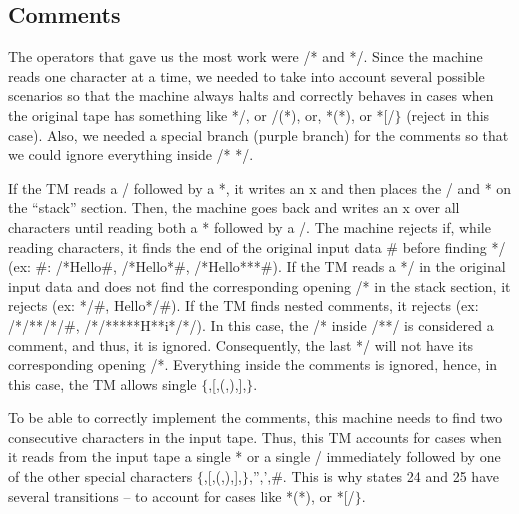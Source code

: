 \documentclass{article}
\begin{document}
\subsection{Comments}

The operators that gave us the most work were /* and */. Since the machine reads one character at a time, we needed to take into account several possible scenarios 
so that the machine always halts and correctly behaves in cases when the original tape has something like *{/}, or /(*), or, *(*), or *[/$\}$ (reject in this case). 
Also, we needed a special branch (purple branch) for the comments so that we could 
ignore everything inside /* */.

If the TM reads a / followed by a *, it writes an x and then places the / and * on the “stack” section. Then, the machine goes back and writes an x over all characters 
until reading both a * followed by a /. The machine rejects if, while reading characters, it finds the end of the original input data $\#$ before finding */ 
(ex: $\#$: /*Hello$\#$, /*Hello*$\#$, /*Hello***$\#$). If the TM reads a */ in the original input data and does not find the corresponding opening 
/* in the stack section, it rejects (ex: */$\#$, Hello*/$\#$). If the TM finds nested comments, it rejects (ex: /*/**/*/$\#$, /*/*****H**i*/*/). In this case, the /* inside /**/ 
is considered a comment, and thus, it is ignored. Consequently, the last */ will not have its corresponding opening /*. Everything inside the comments is ignored, hence, in this 
case, the TM allows single $\{$,[,(,),],$\}$. 

To be able to correctly implement the comments, this machine needs to find two consecutive characters in the input tape. Thus, this TM accounts for cases when it reads from the input tape a single * or a single / immediately followed by one of the other special characters  $\{$,[,(,),],$\}$,”,’,$\#$.
This is why states 24 and 25 have several transitions -- to account for cases like *(*), or *[/$\}$.
\end{document}
